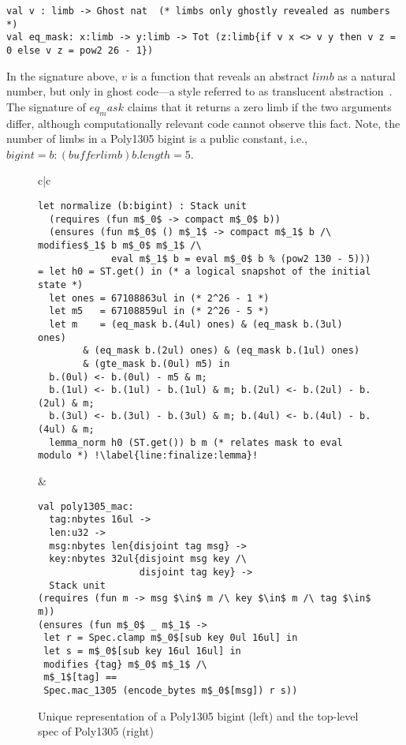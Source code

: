 \begin{lstlisting}[numbers=none]
val v : limb -> Ghost nat  (* limbs only ghostly revealed as numbers *)
val eq_mask: x:limb -> y:limb -> Tot (z:limb{if v x <> v y then v z = 0 else v z = pow2 26 - 1})
\end{lstlisting}

\noindent In the signature above, \lst$v$ is a function that reveals
an abstract \lst$limb$ as a natural number, but only in ghost code---a
style referred to as translucent abstraction~\cite{mumon}. The
signature of \lst$eq_mask$ claims that it returns a zero limb if the
two arguments differ, although computationally relevant code cannot
observe this fact. Note,
the number of limbs in a Poly1305 bigint is a
public constant, i.e., \lst$bigint = b:(buffer limb){b.length = 5}$.

\begin{figure*}[t!]\small
\begin{tabular}{c|c}
\begin{lstlisting}[language=fstar]
let normalize (b:bigint) : Stack unit
  (requires (fun m$_0$ -> compact m$_0$ b))
  (ensures (fun m$_0$ () m$_1$ -> compact m$_1$ b /\ modifies$_1$ b m$_0$ m$_1$ /\
             eval m$_1$ b = eval m$_0$ b % (pow2 130 - 5)))
= let h0 = ST.get() in (* a logical snapshot of the initial state *)
  let ones = 67108863ul in (* 2^26 - 1 *)
  let m5   = 67108859ul in (* 2^26 - 5 *)
  let m    = (eq_mask b.(4ul) ones) & (eq_mask b.(3ul) ones)
        & (eq_mask b.(2ul) ones) & (eq_mask b.(1ul) ones) 
        & (gte_mask b.(0ul) m5) in
  b.(0ul) <- b.(0ul) - m5 & m;
  b.(1ul) <- b.(1ul) - b.(1ul) & m; b.(2ul) <- b.(2ul) - b.(2ul) & m;
  b.(3ul) <- b.(3ul) - b.(3ul) & m; b.(4ul) <- b.(4ul) - b.(4ul) & m;
  lemma_norm h0 (ST.get()) b m (* relates mask to eval modulo *) !\label{line:finalize:lemma}!
\end{lstlisting}

&\quad

\begin{lstlisting}
val poly1305_mac:
  tag:nbytes 16ul ->
  len:u32 ->
  msg:nbytes len{disjoint tag msg} ->
  key:nbytes 32ul{disjoint msg key /\
                  disjoint tag key} ->
  Stack unit
(requires (fun m -> msg $\in$ m /\ key $\in$ m /\ tag $\in$ m))
(ensures (fun m$_0$ _ m$_1$ ->
 let r = Spec.clamp m$_0$[sub key 0ul 16ul] in
 let s = m$_0$[sub key 16ul 16ul] in
 modifies {tag} m$_0$ m$_1$ /\
 m$_1$[tag] ==
 Spec.mac_1305 (encode_bytes m$_0$[msg]) r s))
\end{lstlisting}
\end{tabular}
\caption{Unique representation of a Poly1305 bigint (left) and the top-level spec of Poly1305 (right)}
\label{fig:finalize}
\end{figure*}

